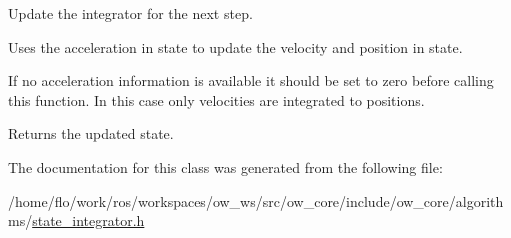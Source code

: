 Update the integrator for the next step. 

Uses the acceleration in state to update the velocity and position in state.

If no acceleration information is available it should be set to zero before calling this function. In this case only velocities are integrated to positions.

\begin{DoxyReturn}{Returns}
the updated state. 
\end{DoxyReturn}


The documentation for this class was generated from the following file\+:\begin{DoxyCompactItemize}
\item 
/home/flo/work/ros/workspaces/ow\+\_\+ws/src/ow\+\_\+core/include/ow\+\_\+core/algorithms/\hyperlink{state__integrator_8h}{state\+\_\+integrator.\+h}\end{DoxyCompactItemize}
